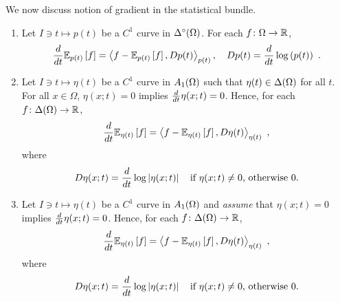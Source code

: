 \documentclass[12pt,a4paper]{amsart}
\begin{document}
We  now discuss notion of gradient in the statistical bundle.

\begin{proposition}
%
  \begin{enumerate}
  \item Let $I \ni t \mapsto p(t)$ be a $C^1$ curve in $\oSimO$. For each $f \colon \Omega \to \reals$,
%
    \begin{equation*}
      \derivby t \expectat {p(t)} {f} = \scalarat {p(t)} {f -\expectat {p(t)} f} {Dp(t)}, \quad Dp(t) = \derivby t \logof{p(t)} \ .
    \end{equation*}
  \item Let $I \ni t \mapsto \eta(t)$ be a $C^1$ curve in $\AffineO$ such that $\eta(t) \in \SimO$ for all $t$. For all $x \in \Omega$, $\eta(x;t) = 0$ implies $\derivby t \eta(x;t)=0$. Hence, for each $f \colon \SimO \to \reals$,
%
    \begin{equation*}
      \derivby t \expectat {\eta(t)} {f} = \scalarat {\eta(t)} {f - \expectat {\eta(t)} f} {D\eta(t)} \ ,
    \end{equation*}
where
\begin{equation*}
  D\eta(x;t) = \derivby t \log\avalof{\eta(x;t)} \quad \text{if $\eta(x;t) \ne 0$, otherwise 0} .  
\end{equation*}
  \item Let $I \ni t \mapsto \eta(t)$ be a $C^1$ curve in $\AffineO$ and \emph{assume} that  $\eta(x;t) = 0$ implies $\derivby t \eta(x;t)=0$. Hence, for each $f \colon \SimO \to \reals$,
%
    \begin{equation*}
      \derivby t \expectat {\eta(t)} {f} = \scalarat {\eta(t)} {f - \expectat {\eta(t)} f} {D\eta(t)} \ ,
    \end{equation*}
where
\begin{equation*}
  D\eta(x;t) = \derivby t \log\avalof{\eta(x;t)} \quad \text{if $\eta(x;t) \ne 0$, otherwise 0} .  
\end{equation*}
  \end{enumerate}
\end{proposition}
\end{document}
